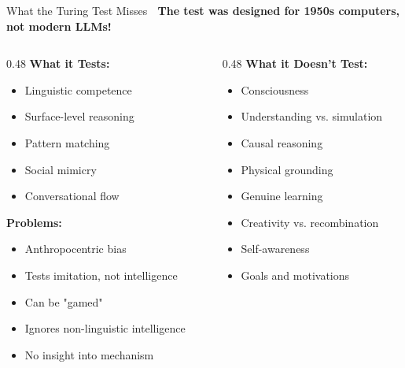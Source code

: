 \documentclass[aspectratio=169]{beamer}
\begin{document}
\begin{frame}{What the Turing Test Misses 🎯}
\textbf{The test was designed for 1950s computers, not modern LLMs!}

\vspace{1em}

\begin{columns}[T]
\begin{column}{0.48\textwidth}
\textbf{What it Tests:}
\begin{itemize}
    \item \alert{Linguistic competence}
    \item Surface-level reasoning
    \item Pattern matching
    \item Social mimicry
    \item Conversational flow
\end{itemize}

\vspace{0.5em}

\textbf{Problems:}
\begin{itemize}
    \item Anthropocentric bias
    \item Tests imitation, not intelligence
    \item Can be "gamed"
    \item Ignores non-linguistic intelligence
    \item No insight into mechanism
\end{itemize}
\end{column}

\begin{column}{0.48\textwidth}
\textbf{What it Doesn't Test:}
\begin{itemize}
    \item Consciousness
    \item Understanding vs. simulation
    \item Causal reasoning
    \item Physical grounding
    \item Genuine learning
    \item Creativity vs. recombination
    \item Self-awareness
    \item Goals and motivations
\end{itemize}


\end{column}
\end{columns}
\end{frame}
\end{document}

